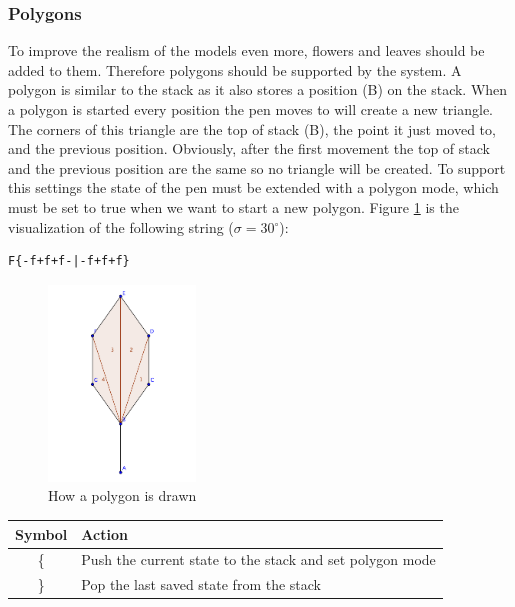 \documentclass[11pt,a4paper]{article}
\newcommand{\degree}{\ensuremath{^\circ}}
\begin{document}
\subsubsection{Polygons}
To improve the realism of the models even more, flowers and leaves should be added to them. Therefore polygons should be supported by the system. A polygon is similar to the stack as it also stores a position (B) on the stack. When a polygon is started every position the pen moves to will create a new triangle. The corners of this triangle are the top of stack (B), the point it just moved to, and the previous position. Obviously, after the first movement the top of stack and the previous position are the same so no triangle will be created. To support this settings the state of the pen must be extended with a polygon mode, which must be set to true when we want to start a new polygon. Figure \ref{fig:polygon} is the visualization of the following string ($\sigma = 30\degree$):
\begin{verbatim}
F{-f+f+f-|-f+f+f}
\end{verbatim}


\begin{figure}[h!]
  \centering
  \includegraphics[width=0.35\textwidth]{polygons.pdf}
  \caption{How a polygon is drawn}
  \label{fig:polygon}
\end{figure}

\begin{center}
\begin{tabular}{c | l}
Symbol & Action \\ \hline
\{ & Push the current state to the stack and set polygon mode \\
\} & Pop the last saved state from the stack \\
\end{tabular}
\end{center}

\end{document}
